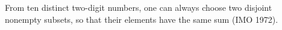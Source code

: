 From ten distinct two-digit numbers, one can always choose two disjoint nonempty subsets, so that their elements have the same sum (IMO 1972).
